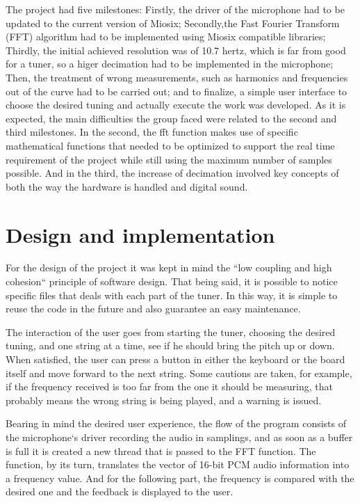 The project had five milestones: Firstly, the driver of the microphone had to be updated to the current version of Miosix; Secondly,the Fast Fourier Transform (FFT) algorithm had to be implemented using Miosix compatible libraries; Thirdly, the initial achieved resolution was of 10.7 hertz, which is far from good for a tuner, so a higer decimation had to be implemented in the microphone; Then, the treatment of wrong measurements, such as harmonics and frequencies out of the curve had to be carried out; and to finalize, a simple user interface to choose the desired tuning and actually execute the work was developed.\newline
As it is expected, the main difficulties the group faced were related to the second and third milestones. In the second, the fft function makes use of specific mathematical functions that needed to be optimized to support the real time requirement of the project while still using the maximum number of samples possible. And in the third, the increase of decimation involved key concepts of both the way the hardware is handled and digital sound.
\pagebreak

\section{Design and implementation}

For the design of the project it was kept in mind the ``low coupling and high cohesion`` principle of software design.  That being said, it is possible to notice specific files that deals with each part of the tuner. In this way, it is simple to reuse the code in the future and also guarantee an easy maintenance.

The interaction of the user goes from starting the tuner, choosing the desired tuning, and one string at a time, see if he should bring the pitch up or down. When satisfied, the user can press a button in either the keyboard or the board itself and move forward to the next string. Some cautions are taken, for example, if the frequency received is too far from the one it should be measuring, that probably means the wrong string is being played, and a warning is issued.

Bearing in mind the desired user experience, the flow of the program consists of the microphone`s driver recording the audio in samplings, and as soon as a buffer is full it is created a new thread that is passed to the FFT function. The function, by its turn, translates the vector of 16-bit PCM audio information into a frequency value. And for the following part, the frequency is compared with the desired one and the feedback is displayed to the user.

